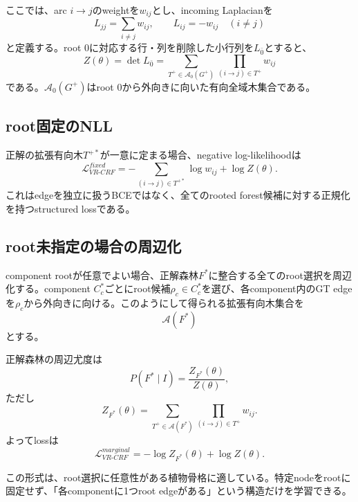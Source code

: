 \documentclass[11pt,a4paper]{article}
\begin{document}
ここでは、arc $i\to j$のweightを$w_{ij}$とし、incoming Laplacianを
\begin{equation}
  L_{jj}=\sum_{i\neq j} w_{ij},
  \qquad
  L_{ij}=-w_{ij}\quad(i\neq j)
\end{equation}
と定義する。root $0$に対応する行・列を削除した小行列を$L_{\bar{0}}$とすると、
\begin{equation}
  Z(\theta)=\det L_{\bar{0}}
  =
  \sum_{T^+\in\mathcal{A}_0(G^+)}
  \prod_{(i\to j)\in T^+}w_{ij}
\end{equation}
である。$\mathcal{A}_0(G^+)$はroot $0$から外向きに向いた有向全域木集合である。

\subsection{root固定のNLL}
正解の拡張有向木$T^{+*}$が一意に定まる場合、negative log-likelihoodは
\begin{equation}
  \mathcal{L}_{VR\text{-}CRF}^{fixed}
  =
  -\sum_{(i\to j)\in T^{+*}}\log w_{ij}
  +\log Z(\theta).
  \label{eq:crf_fixed}
\end{equation}
これはedgeを独立に扱うBCEではなく、全てのrooted forest候補に対する正規化を持つstructured lossである。

\subsection{root未指定の場合の周辺化}
component rootが任意でよい場合、正解森林$F^*$に整合する全てのroot選択を周辺化する。component $C_c^*$ごとにroot候補$\rho_c\in C_c^*$を選び、各component内のGT edgeを$\rho_c$から外向きに向ける。このようにして得られる拡張有向木集合を
\begin{equation}
  \mathcal{A}(F^*)
\end{equation}
とする。

正解森林の周辺尤度は
\begin{equation}
  P(F^*\mid I)
  =
  \frac{Z_{F^*}(\theta)}{Z(\theta)},
\end{equation}
ただし
\begin{equation}
  Z_{F^*}(\theta)
  =
  \sum_{T^+\in\mathcal{A}(F^*)}
  \prod_{(i\to j)\in T^+}w_{ij}.
\end{equation}
よってlossは
\begin{equation}
  \mathcal{L}_{VR\text{-}CRF}^{marginal}
  =
  -\log Z_{F^*}(\theta)+\log Z(\theta).
  \label{eq:crf_marginal}
\end{equation}

この形式は、root選択に任意性がある植物骨格に適している。特定nodeをrootに固定せず、「各componentに1つroot edgeがある」という構造だけを学習できる。
\end{document}
